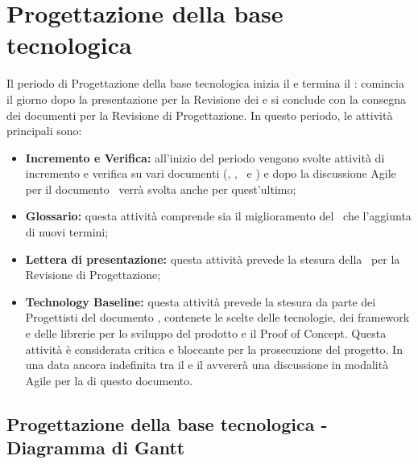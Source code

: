 \documentclass[PianoDiProgetto.tex]{subfiles}
\begin{document}
\section{Progettazione della base tecnologica}
Il periodo di Progettazione della base tecnologica inizia il  e termina il : comincia il giorno dopo la presentazione per la Revisione dei  e si conclude con la consegna dei documenti per la Revisione di Progettazione. In questo periodo, le attività principali sono:
\begin{itemize}
	\item \textbf{Incremento e Verifica:} all'inizio del periodo vengono svolte attività di incremento e verifica su vari documenti (\ndp, \pdp, \pdq\ e \adr) e dopo la discussione Agile per il documento \tb\ verrà svolta anche per quest'ultimo;
	\item \textbf{Glossario:} questa attività comprende sia il miglioramento del \g\ che l'aggiunta di nuovi termini;
	\item \textbf{Lettera di presentazione:} questa attività prevede la stesura della \ per la Revisione di Progettazione;
	\item \textbf{Technology Baseline:} questa attività prevede la stesura da parte dei Progettisti del documento \tb, contenete le scelte delle tecnologie, dei framework e delle librerie per lo sviluppo del prodotto e il Proof of Concept. Questa attività è considerata critica e bloccante per la prosecuzione del progetto. In una data ancora indefinita tra il  e il  avvererà una discussione in modalità Agile per la  di questo documento.
\end{itemize}
\begin{landscape}
	\subsection{Progettazione della base tecnologica - Diagramma di Gantt}
\end{landscape}
\end{document}
